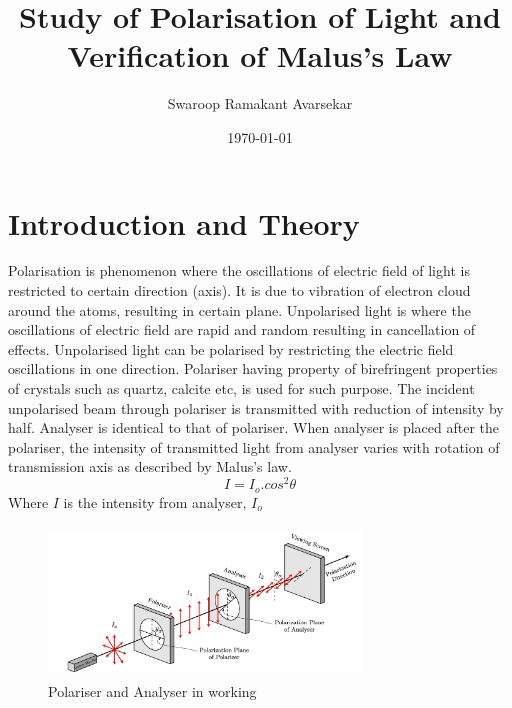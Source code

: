\documentclass[a4paper, amsfonts, amssymb, amsmath, reprint, showkeys, nofootinbib, twoside]{revtex4-1}
\begin{document}
\title{Study of Polarisation of Light and Verification of Malus's Law}
\author{Swaroop Ramakant Avarsekar}
\date{\today}
	
\maketitle

\section{Introduction and Theory}
Polarisation is phenomenon where the oscillations of electric field of light is restricted to certain direction (axis). It is due to vibration of electron cloud around the atoms, resulting in certain plane. Unpolarised light is where the oscillations of electric field are rapid and random resulting in cancellation of effects. Unpolarised light can be polarised by restricting the electric field oscillations in one direction. Polariser having property of birefringent properties of crystals such as quartz, calcite etc, is used for such purpose. The incident unpolarised beam through polariser is transmitted with reduction of intensity by half. Analyser is identical to that of polariser. When analyser is placed after the polariser, the intensity of transmitted light from analyser varies with rotation of transmission axis as described by Malus's law.
\begin{equation}
	I=I_o.cos^2\theta
\end{equation}
Where $I$ is the intensity from analyser, $I_o$
 
\begin{figure}[H] %
	\centering
	\includegraphics[width=8.3cm,height=4cm]{1} 
	\caption{Polariser and Analyser in working}
	\label{1}
\end{figure}
\end{document}
